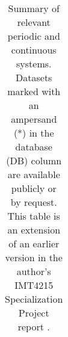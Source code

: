 \begin{table}[ht]
{\begin{tabular}{llllllll}
%
\end{tabular}
}
\caption{Summary of relevant periodic and continuous systems. Datasets marked with an ampersand (*) in the database (DB) column are available publicly or by request. This table is an extension of an earlier version in the author's IMT4215 Specialization Project report \cite{nilsenSpec}.}
\label{tab:summary}
\end{table}


